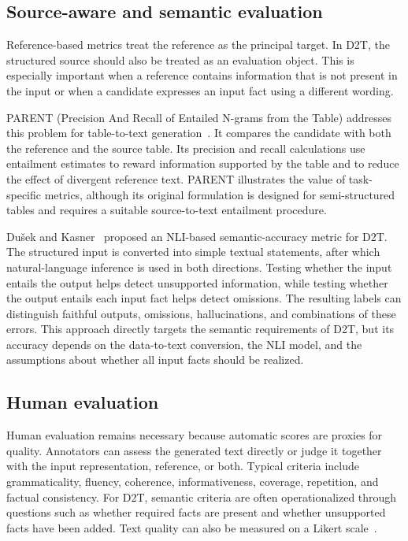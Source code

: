 \subsection{Source-aware and semantic evaluation}

Reference-based metrics treat the reference as the principal target. In D2T,
the structured source should also be treated as an evaluation object. This is
especially important when a reference contains information that is not present
in the input or when a candidate expresses an input fact using a different
wording.

PARENT (Precision And Recall of Entailed N-grams from the Table) addresses this
problem for table-to-text generation~\cite{dhingra-etal-2019-handling}. It
compares the candidate with both the reference and the source table. Its
precision and recall calculations use entailment estimates to reward information
supported by the table and to reduce the effect of divergent reference text.
PARENT illustrates the value of task-specific metrics, although its original
formulation is designed for semi-structured tables and requires a suitable
source-to-text entailment procedure.

Dušek and Kasner~\cite{dusek-kasner-2020-evaluating} proposed an NLI-based
semantic-accuracy metric for D2T. The structured input is converted into simple
textual statements, after which natural-language inference is used in both
directions. Testing whether the input entails the output helps detect
unsupported information, while testing whether the output entails each input
fact helps detect omissions. The resulting labels can distinguish faithful
outputs, omissions, hallucinations, and combinations of these errors. This
approach directly targets the semantic requirements of D2T, but its accuracy
depends on the data-to-text conversion, the NLI model, and the assumptions about
whether all input facts should be realized.

\subsection{Human evaluation}

Human evaluation remains necessary because automatic scores are proxies for
quality. Annotators can assess the generated text directly or judge it together
with the input representation, reference, or both. Typical criteria include
grammaticality, fluency, coherence, informativeness, coverage, repetition, and
factual consistency. For D2T, semantic criteria are often operationalized
through questions such as whether required facts are present and whether
unsupported facts have been added. Text quality can also be measured on a Likert
scale~\cite{gatt2018survey,novikova-etal-2017-need}.

